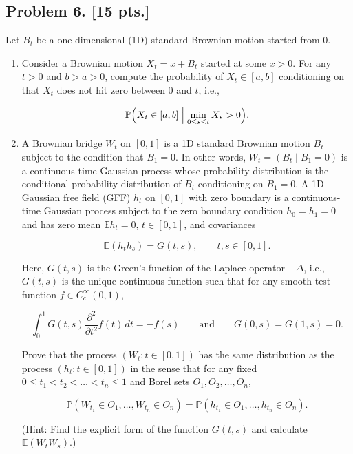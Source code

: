 \documentclass[11pt,a4paper]{article}
\begin{document}
\subsection{Problem 6. [15 pts.]}
Let \( B_t \) be a one-dimensional (1D) standard Brownian motion started from 0.
\begin{enumerate}[label=(\alph*)]
    \item Consider a Brownian motion \( X_t = x + B_t \) started at some \( x > 0 \). For any \( t > 0 \) and \( b > a > 0 \), compute the probability of \( X_t \in [a, b] \) conditioning on that \( X_t \) does not hit zero between 0 and \( t \), i.e.,

    \[
    \mathbb{P}\Bigl( X_t \in [a, b] \Bigm| \min_{0 \le s \le t} X_s > 0 \Bigr).
    \]
    \item A Brownian bridge \( W_t \) on \( [0, 1] \) is a 1D standard Brownian motion \( B_t \) subject to the condition that \( B_1 = 0 \). In other words, \( W_t = (B_t \mid B_1 = 0) \) is a continuous-time Gaussian process whose probability distribution is the conditional probability distribution of \( B_t \) conditioning on \( B_1 = 0 \). A 1D Gaussian free field (GFF) \( h_t \) on \( [0, 1] \) with zero boundary is a continuous-time Gaussian process subject to the zero boundary condition \( h_0 = h_1 = 0 \) and has zero mean \( \mathbb{E} h_t = 0 \), \( t \in [0, 1] \), and covariances

    \[
    \mathbb{E}(h_t h_s) = G(t, s), \qquad t, s \in [0, 1].
    \]

    Here, \( G(t, s) \) is the Green's function of the Laplace operator \( -\Delta \), i.e., \( G(t, s) \) is the unique continuous function such that for any smooth test function \( f \in C_c^\infty(0, 1) \),

    \[
    \int_0^1 G(t, s) \frac{\partial^2}{\partial t^2} f(t)\, dt = -f(s) \qquad \text{and} \qquad G(0, s) = G(1, s) = 0.
    \]

    Prove that the process \( (W_t : t \in [0, 1]) \) has the same distribution as the process \( (h_t : t \in [0, 1]) \) in the sense that for any fixed \( 0 \le t_1 < t_2 < \dots < t_n \le 1 \) and Borel sets \( O_1, O_2, \dots, O_n \),

    \[
    \mathbb{P}(W_{t_1} \in O_1, \dots, W_{t_n} \in O_n) = \mathbb{P}(h_{t_1} \in O_1, \dots, h_{t_n} \in O_n).
    \]

    (Hint: Find the explicit form of the function \( G(t, s) \) and calculate \( \mathbb{E}(W_t W_s) \).)
\end{enumerate}
\end{document}
